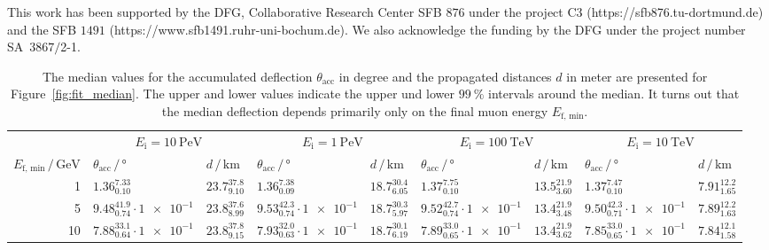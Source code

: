 \begin{acknowledgement}
  This work has been supported by the DFG, Collaborative Research Center SFB $876$
  under the project C3 
  (https://sfb876.tu-dortmund.de) and the SFB $1491$ (https://www.sfb1491.ruhr-uni-bochum.de).
  We also acknowledge the funding by the DFG under the project number SA~$3867/$2-1.
\end{acknowledgement}

\begin{table*}
    \centering
    \caption{The median values for the accumulated deflection $\theta_{\mathrm{acc}}$ in degree and the propagated distances 
    $d$ in meter are presented for Figure~\ref{fig:fit_median}. The upper and lower values indicate the upper und lower 
    $\SI{99}{\percent}$ intervals around the median. It turns out that the median deflection depends primarily 
    only on the final muon energy $E_{\mathrm{f,\,min}}$.}
    \label{tab:final_values}       %
    \begin{tabular}{r|ll|ll|ll|ll}
    \hline\noalign{\smallskip}
    & \multicolumn{2}{c|}{$E_{\mathrm{i}} = \SI{10}{\peta\electronvolt}$} & \multicolumn{2}{c|}{$E_{\mathrm{i}} = \SI{1}{\peta\electronvolt}$} 
    & \multicolumn{2}{c|}{$E_{\mathrm{i}} = \SI{100}{\tera\electronvolt}$} & \multicolumn{2}{c}{$E_{\mathrm{i}} = \SI{10}{\tera\electronvolt}$} \\
    $E_{\mathrm{f,\,min}}\,/\,\si{\giga\electronvolt}$ & $\theta_{\text{acc}}\,/\,\si{\degree}$ & $d\,/\,\si{\kilo\meter}$  
    & $\theta_{\text{acc}}\,/\,\si{\degree}$ & $d\,/\,\si{\kilo\meter}$ 
    & $\theta_{\text{acc}}\,/\,\si{\degree}$ & $d\,/\,\si{\kilo\meter}$
    & $\theta_{\text{acc}}\,/\,\si{\degree}$ & $d\,/\,\si{\kilo\meter}$\\
    \noalign{\smallskip}\hline\noalign{\smallskip}
    \rule{0pt}{2.6ex}\num{1}        & $1.36_{0.10}^{7.33}$ & $23.7_{9.10}^{37.8}$ & $1.36_{0.09}^{7.38}$ & $18.7_{6.05}^{30.4}$ & $1.37_{0.10}^{7.75}$ & $13.5_{3.60}^{21.9}$ & $1.37_{0.10}^{7.47}$ & $7.91_{1.65}^{12.2}$ \\
    \rule{0pt}{2.6ex}\num{5}        & $9.48_{0.74}^{41.9}\cdot \num{1e-1}$ & $23.8_{8.99}^{37.6}$ & $9.53_{0.74}^{42.3}\cdot \num{1e-1}$ & $18.7_{5.97}^{30.3}$ & $9.52_{0.74}^{42.7}\cdot \num{1e-1}$ & $13.4_{3.48}^{21.9}$ & $9.50_{0.71}^{42.3}\cdot \num{1e-1}$ & $7.89_{1.63}^{12.2}$ \\
    \rule{0pt}{2.6ex}\num{10}       & $7.88_{0.64}^{33.1}\cdot \num{1e-1}$ & $23.8_{9.15}^{37.8}$ & $7.93_{0.63}^{32.0}\cdot \num{1e-1}$ & $18.7_{6.19}^{30.1}$ & $7.89_{0.65}^{33.0}\cdot \num{1e-1}$ & $13.4_{3.62}^{21.9}$ & $7.85_{0.65}^{33.0}\cdot \num{1e-1}$ & $7.84_{1.58}^{12.1}$ \\

\end{tabular}
\end{table*}
